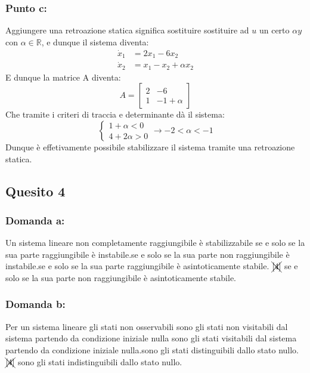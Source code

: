 \documentclass[a4paper]{report}
\newcommand{\R}{\mathbb{R}}%
\begin{document}
\subsubsection*{Punto c:}
Aggiungere una retroazione statica significa sostituire sostituire ad $u$ un certo $\alpha y$ con $\alpha\in\R$, e dunque il sistema diventa:
\begin{align*}
\dot{x}_1&=2x_1-6x_2\\
\dot{x}_2&=x_1-x_2+\alpha x_2
\end{align*}
E dunque la matrice A diventa:
\[
A=\begin{bmatrix}
2 & -6\\
1 & -1+\alpha
\end{bmatrix}
\]
Che tramite i criteri di traccia e determinante dà il sistema:
\[
\left\{\begin{array}{l}
1+\alpha<0\\
4+2\alpha >0 
\end{array}\right.\longrightarrow\boxed{-2 < \alpha < -1}
\]
Dunque è effetivamente possibile stabilizzare il sistema tramite una retroazione statica.
\subsection*{Quesito 4}
\subsubsection*{Domanda a:}
Un sistema lineare non completamente raggiungibile è stabilizzabile
\bigskip \newline
[1] se e solo se la sua parte raggiungibile è instabile.\newline
[2] se e solo se la sua parte non raggiungibile è instabile.\newline
[3] se e solo se la sua parte raggiungibile è asintoticamente stabile. \newline
$\xcancel{[4]}$ se e solo se la sua parte non raggiungibile è asintoticamente stabile.
\subsubsection*{Domanda b:}
Per un sistema lineare gli stati non osservabili 
\bigskip\newline
[1] sono gli stati non visitabili dal sistema partendo da condizione iniziale nulla \newline
[2] sono gli stati visitabili dal sistema partendo da condizione iniziale nulla.\newline
[3] sono gli stati distinguibili dallo stato nullo.\newline
$\xcancel{[4]}$ sono gli stati indistinguibili dallo stato nullo.
\end{document}
